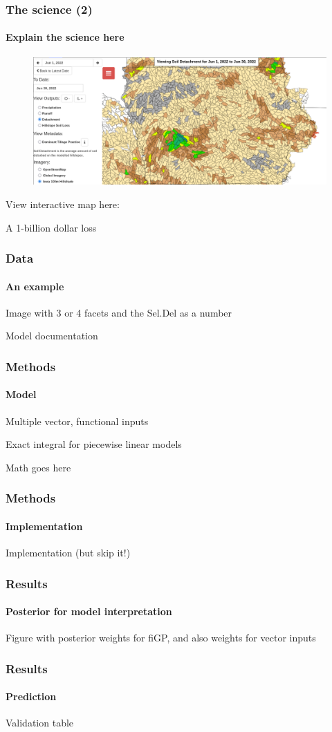 \documentclass{snedecorbeamer}
\begin{document}
\begin{frame}
  \frametitle{The science (2)}
  \framesubtitle{Explain the science here}

  \begin{figure}
    \centering
    \includegraphics[width=.8\textwidth]{inc/dep_detachment_map_20220630_168}
  \end{figure}

  {\tiny
    View interactive map here: 
  }

  A 1-billion dollar loss
\end{frame}


\begin{frame}
  \frametitle{Data}
  \framesubtitle{An example}

  Image with 3 or 4 facets and the Sel.Del as a number

  {\tiny
    Model documentation}
\end{frame}

\begin{frame}
  \frametitle{Methods}
  \framesubtitle{Model}

  Multiple vector, functional inputs

  Exact integral for piecewise linear models

  Math goes here
\end{frame}

\begin{frame}
  \frametitle{Methods}
  \framesubtitle{Implementation}

  Implementation (but skip it!)
\end{frame}

\begin{frame}
  \frametitle{Results}
  \framesubtitle{Posterior for model interpretation}

  Figure with posterior weights for fiGP, and also weights for vector inputs
\end{frame}

\begin{frame}
  \frametitle{Results}
  \framesubtitle{Prediction}

  Validation table
\end{frame}
\end{document}
